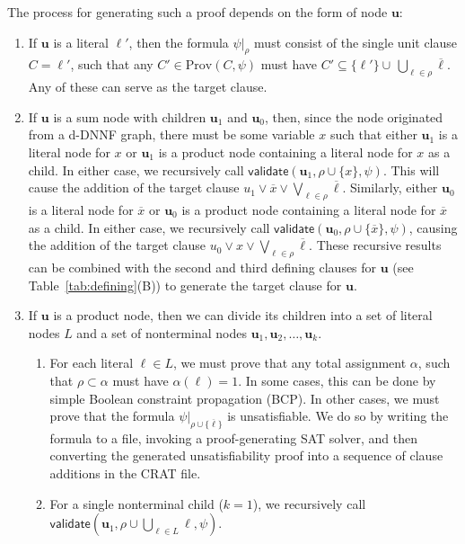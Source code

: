 \documentclass[letterpaper,USenglish,cleveref, autoref, thm-restate]{lipics-v2021}
\newcommand{\obar}[1]{\overline{#1}}
\newcommand{\lit}{\ell}
\newcommand{\passign}{\rho}
\newcommand{\validate}{\textsf{validate}}
\newcommand{\prov}{\textrm{Prov}}
\newcommand{\makenode}[1]{\mathbf{#1}}
\newcommand{\nodeu}{\makenode{u}}
\newcommand{\simplify}[2]{#1|_{#2}}
\begin{document}
The process for generating such a proof depends on the form of node $\nodeu$:
\begin{enumerate}
\item If $\nodeu$ is a literal $\lit'$, then the formula
  $\simplify{\psi}{\passign}$ must consist of the single unit clause
  $C = \lit'$, such that any $C' \in \prov(C, \psi)$ must have $C' \subseteq \{ \lit' \} \cup\, \bigcup_{\lit \in \passign} \obar{\lit}$.
  Any of these can
  serve as the target clause.
\item If $\nodeu$ is a sum node with children $\nodeu_1$ and $\nodeu_0$,
  then, since the node originated from a d-DNNF graph, there must be
  some variable $x$ such that either $\nodeu_1$ is a literal node for $x$ or $\nodeu_1$ is a
  product node containing a literal node for $x$ as a child.  In either case, we
  recursively call $\validate(\nodeu_1, \passign \cup \{ x \}, \psi)$.
  This will cause the addition of the target clause
  $u_1 \lor \obar{x} \lor \bigvee_{\lit \in \passign} \obar{\lit}$.
Similarly, either $\nodeu_0$ is a literal node for $\obar{x}$ or $\nodeu_0$ is a product node containing a literal node for $\obar{x}$ as
  a child.  In either case, we recursively call $\validate(\nodeu_0, \passign \cup \{ \obar{x} \}, \psi)$,
  causing the addition of the target clause
  $u_0 \lor x \lor \bigvee_{\lit \in \passign} \obar{\lit}$.
  These recursive results can be combined with the second and third defining clauses for $\nodeu$
(see Table~\ref{tab:defining}(B))
  to generate the target clause for $\nodeu$.
\item If $\nodeu$ is a product node, then we can divide its children
  into a set of literal nodes $L$ and a set of nonterminal nodes $\nodeu_1, \nodeu_2, \ldots, \nodeu_k$.
  \begin{enumerate}
    \item For each literal
  $\lit \in L$, we must prove that any total assignment $\alpha$, such that
  $\passign \subset \alpha$ must have $\alpha(\lit) = 1$.  In some
  cases, this can be done by simple Boolean constraint propagation (BCP).
  In other cases, we must prove that the formula
  $\simplify{\psi}{\passign \cup \{\obar{\lit}\}}$ is unsatisfiable.  We
  do so by writing the formula to a file, invoking a proof-generating
  SAT solver, and then converting the generated unsatisfiability proof
  into a sequence of clause additions in the CRAT file.
\item For a single nonterminal child ($k = 1$), we recursively call
  $\validate \left(\nodeu_1, \passign \cup \bigcup_{\lit \in L} \lit, \psi\right)$.

\end{enumerate}
\end{enumerate}
\end{document}
